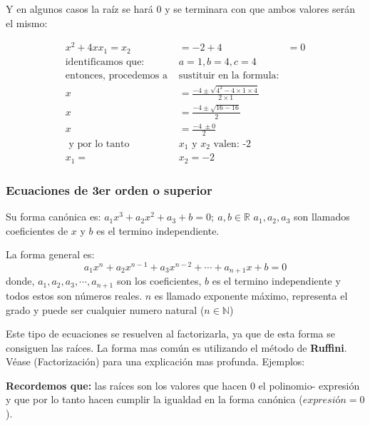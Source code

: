 \documentclass[12pt]{article}
\begin{document}
    Y en algunos casos la raíz se hará 0 y se terminara con que ambos valores
    serán el mismo:

    \begin{align*}
        x^2 +4x x_1=x_2&=-2+4 &= 0		\\
        \text{identificamos que: }& a=1,b=4,c=4\\
        \text{entonces, procedemos a }&\text{sustituir en la formula:}\\
        x &= \frac{-4\pm \sqrt{4^2-4\times1\times4}}{2\times1}\\
        x &= \frac{-4 \pm \sqrt{ 16 - 16}}{2} \\
        x &= \frac{-4\ \pm 0}{2}\\
        \text{ y por lo tanto }&\text{$x_1$ y $x_2$ valen: -2}\\
        x_1=&x_2=-2
    \end{align*}




    \subsubsection*{Ecuaciones de 3er orden o superior} \label{Ecuaciones-de-3er-orden-o-superior}
    Su forma canónica es: $a_1x^3+a_2x^2+a_3+b=0;\ a,b\in\mathbb{R}$ $a_1,a_2,a_3$ son
    llamados coeficientes  de $x$ y $b$ es el termino independiente.

    La forma general es:
    $$a_1x^n+a_2x^{n-1}+a_3x^{n-2}+\cdots+a_{n+1}x+b = 0$$
    donde, $a_1,a_2,a_3,\cdots,a_{n+1}$ son los coeficientes, $b$ es el termino
    independiente y todos estos son números reales. $n$ es llamado exponente máximo,
    representa el grado y puede ser cualquier numero natural ($n \in \mathbb{N}$)


    Este tipo de ecuaciones se resuelven al factorizarla, ya que de esta forma
    se consiguen las raíces. La forma mas común es utilizando el método
    de \textbf{Ruffini}. Véase (\refname{Factorización}) para una explicación
    mas profunda.
    Ejemplos:

    \textbf{Recordemos que:} las raíces son los valores que hacen 0 el polinomio-
    expresión y que por lo tanto hacen cumplir la igualdad en la forma canónica
    ($expresión=0$).
\end{document}
